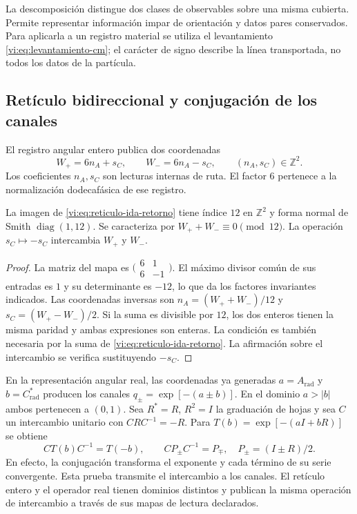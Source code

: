 La descomposición distingue dos clases de observables sobre una
misma cubierta. Permite representar información impar de orientación
y datos pares conservados. Para aplicarla a un registro material se
utiliza el levantamiento \eqref{vi:eq:levantamiento-cm}; el carácter
de signo describe la línea transportada, no todos los datos de la
partícula.

\subsection{Retículo bidireccional y conjugación de los canales}
\label{vi:subsec:reticulo-bidireccional}

El registro angular entero publica dos coordenadas
\begin{equation}
 W_+=6n_A+s_C,\qquad W_-=6n_A-s_C,
 \qquad (n_A,s_C)\in\mathbb Z^2.
 \label{vi:eq:reticulo-ida-retorno}
\end{equation}
Los coeficientes $n_A,s_C$ son lecturas internas de ruta. El factor
$6$ pertenece a la normalización dodecafásica de ese registro.

\begin{proposition}
\label{vi:prop:indice-bidireccional}
La imagen de \eqref{vi:eq:reticulo-ida-retorno} tiene índice $12$
en $\mathbb Z^2$ y forma normal de Smith $\operatorname{diag}(1,12)$.
Se caracteriza por $W_++W_-\equiv0\pmod{12}$. La operación
$s_C\mapsto-s_C$ intercambia $W_+$ y $W_-$.
\end{proposition}
\begin{proof}
La matriz del mapa es
$\bigl(\begin{smallmatrix}6&1\\6&-1\end{smallmatrix}\bigr)$.
El máximo divisor común de sus entradas es $1$ y su determinante
es $-12$, lo que da los factores invariantes indicados. Las
coordenadas inversas son
$n_A=(W_++W_-)/12$ y $s_C=(W_+-W_-)/2$.
Si la suma es divisible por $12$, los dos enteros tienen la misma
paridad y ambas expresiones son enteras. La condición es también
necesaria por la suma de \eqref{vi:eq:reticulo-ida-retorno}.
La afirmación sobre el intercambio se verifica sustituyendo $-s_C$.
\end{proof}

En la representación angular real, las coordenadas ya generadas
$a=A_{\mathrm{rad}}$ y $b=C^*_{\mathrm{rad}}$ producen los
canales $q_\pm=\exp[-(a\pm b)]$. En el dominio $a>|b|$ ambos
pertenecen a $(0,1)$. Sea $R^*=R$, $R^2=I$ la graduación de
hojas y sea $C$ un intercambio unitario con $CRC^{-1}=-R$.
Para $T(b)=\exp[-(aI+bR)]$ se obtiene
\begin{equation}
 CT(b)C^{-1}=T(-b),\qquad
 CP_\pm C^{-1}=P_\mp,\quad P_\pm=(I\pm R)/2.
 \label{vi:eq:conjugacion-canales}
\end{equation}
En efecto, la conjugación transforma el exponente y cada término
de su serie convergente. Esta prueba transmite el intercambio a
los canales. El retículo entero y el operador real tienen dominios
distintos y publican la misma operación de intercambio a través de
sus mapas de lectura declarados.

